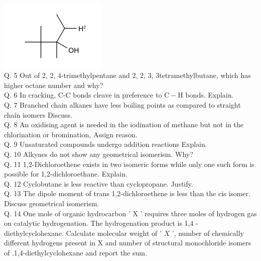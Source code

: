 \documentclass[10pt]{article}
\begin{document}
$\qquad$\\
\includegraphics{smile-0b433643450e010c21c883bd5741b29724fe006a}\\
Q. 5 Out of 2, 2, 4-trimethylpentane and 2, 2, 3, 3tetramethylbutane, which has higher octane number and why?\\
Q. 6 In cracking, C-C bonds cleave in preference to $\mathrm{C}-\mathrm{H}$ bonds. Explain.\\
Q. 7 Branched chain alkanes have less boiling points as compared to straight chaín isomers Discuss.\\
Q. 8 An oxidising agent is needed in the iodination of methane but not in the chlorination or bromination, Assign reason.\\
Q. 9 Unsaturated compounds undergo addition reactions Explain.\\
Q. 10 Alkynes do not show any geometrical isomerism. Why?\\
Q. 11 1,2-Dichloroethene exists in two isomeric forms while only one such form is possible for 1,2-dichloroethane. Explain.\\
Q. 12 Cyclobutane is less reactive than cyclopropane. Justify.\\
Q. 13 The dipole moment of trans 1,2-dichloroethene is less than the cis isomer. Discuss geometrical isomerism.\\
Q. 14 One mole of organic hydrocarbon ' X ' requires three moles of hydrogen gas on catalytic hydrogenation. The hydrogenation product is 1,4 -diethylcyclohexane. Calculate molecular weight of ' $X$ ', number of chemically different hydrogens present in X and number of structural monochloride isomers of .1,4-diethylcyclohexane and report the sum.
\end{document}
